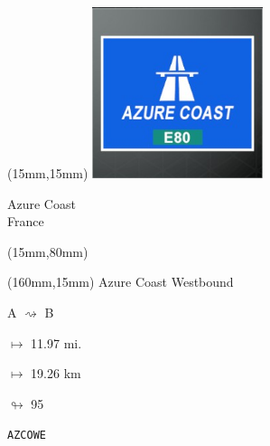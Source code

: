 \begin{textblock*}{50mm}(15mm,15mm)%
\includegraphics[width=50mm]{LG/2015-05-20_00073.png}
\par Azure Coast\\ France
\end{textblock*}
\begin{textblock*}{185mm}(15mm,80mm)%
\end{textblock*}
\begin{textblock*}{40mm}(160mm,15mm)%
Azure Coast Westbound
\par A $\rightsquigarrow$ B
\Large
\par$\mapsto$ 11.97 mi.
\par$\mapsto$ 19.26 km
\par$\looparrowright$ 95
\par\hfill\tiny\tt AZCOWE\\
\end{textblock*}
\null\newpage

